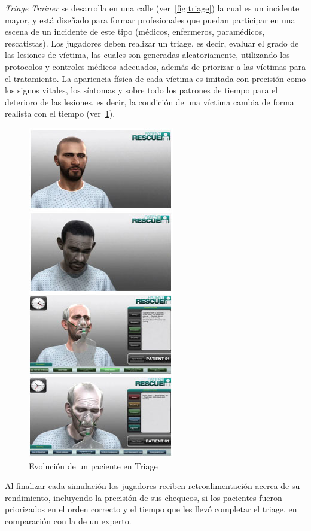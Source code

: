 \emph{Triage Trainer} se desarrolla  en una calle
(ver~\ref{fig:triage}) la cual es un incidente mayor, y está diseñado para
formar profesionales que puedan participar en una escena de un incidente de este
tipo (médicos, enfermeros, paramédicos, rescatistas). Los jugadores deben
realizar un triage, es decir, evaluar el grado de las lesiones de víctima, las
cuales son generadas aleatoriamente, utilizando los protocolos y controles
médicos adecuados, además de priorizar a las víctimas para el tratamiento. La
apariencia física de cada víctima es imitada con precisión como los signos
vitales, los síntomas y sobre todo los patrones de tiempo para el deterioro de
las lesiones, es decir, la condición de una víctima cambia de forma realista con
el tiempo (ver~\ref{fig:triage_patient1}).

\begin{figure}[ht!]
\centering 
\includegraphics[scale=0.5]{tics/images/patient_side.jpg}
\caption{Evolución de un paciente en Triage}
\label{fig:triage_patient1}
\end{figure}

Al finalizar cada simulación los jugadores reciben retroalimentación acerca de
su rendimiento, incluyendo la precisión de sus chequeos, si los pacientes fueron
priorizados en el orden correcto y el tiempo que les llevó completar el triage,
en comparación con la de un experto.

